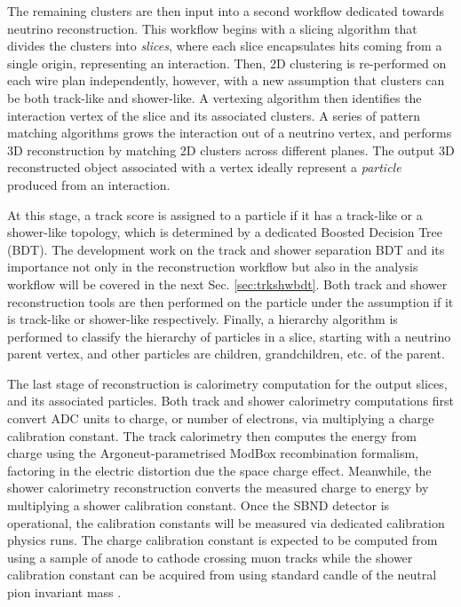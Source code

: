 The remaining clusters are then input into a second workflow dedicated towards neutrino reconstruction.
This workflow begins with a slicing algorithm that divides the clusters into \textit{slices}, where each slice encapsulates hits coming from a single origin, representing an interaction.
Then, 2D clustering is re-performed on each wire plan independently, however, with a new assumption that clusters can be both track-like and shower-like.
A vertexing algorithm then identifies the interaction vertex of the slice and its associated clusters.
A series of pattern matching algorithms grows the interaction out of a neutrino vertex, and performs 3D reconstruction by matching 2D clusters across different planes.
The output 3D reconstructed object associated with a vertex ideally represent a \textit{particle} produced from an interaction.

At this stage, a track score is assigned to a particle if it has a track-like or a shower-like topology, which is determined by a dedicated Boosted Decision Tree (BDT).
The development work on the track and shower separation BDT and its importance not only in the reconstruction workflow but also in the analysis workflow will be covered in the next Sec. \ref{sec:trkshwbdt}.
Both track and shower reconstruction tools are then performed on the particle under the assumption if it is track-like or shower-like respectively. 
Finally, a hierarchy algorithm is performed to classify the hierarchy of particles in a slice, starting with a neutrino parent vertex, and other particles are children, grandchildren, etc. of the parent.

The last stage of reconstruction is calorimetry computation for the output slices, and its associated particles.
Both track and shower calorimetry computations first convert ADC units to charge, or number of electrons, via multiplying a charge calibration constant.
The track calorimetry then computes the energy from charge using the Argoneut-parametrised ModBox recombination formalism, factoring in the electric distortion due the space charge effect.
Meanwhile, the shower calorimetry reconstruction converts the measured charge to energy by multiplying a shower calibration constant.
Once the SBND detector is operational, the calibration constants will be measured via dedicated calibration physics runs.
The charge calibration constant is expected to be computed from using a sample of anode to cathode crossing muon tracks while the shower calibration constant can be acquired from using standard candle of the neutral pion invariant mass \cite{}.

